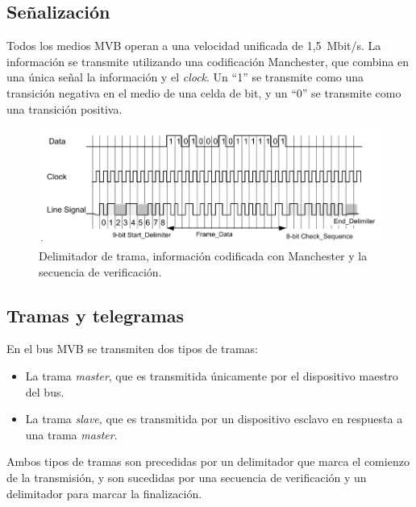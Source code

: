 \subsection{Señalización}

Todos los medios MVB operan a una velocidad unificada de 1,5~Mbit/s.
La información se transmite utilizando una codificación Manchester, que combina en una única señal la información y el \textit{clock}.
Un ``1'' se transmite como una transición negativa en el medio de una celda de bit, y un ``0'' se transmite como una transición positiva.

\begin{figure}[htbp]
	\centering
	\includegraphics[width=1\textwidth]{./Figures/manchester.png}
	\caption[Delimitador de trama, información codificada con Manchester y la secuencia de verificación]{Delimitador de trama, información codificada con Manchester y la secuencia de verificación.
        \\ }
\end{figure}

\subsection{Tramas y telegramas}

En el bus MVB se transmiten dos tipos de tramas:

\begin{itemize}
\item La trama \textit{master}, que es transmitida únicamente por el dispositivo maestro del bus.
\item La trama \textit{slave}, que es transmitida por un dispositivo esclavo en respuesta a una trama \textit{master}.
\end{itemize}

Ambos tipos de tramas son precedidas por un delimitador que marca el comienzo de la transmisión, y son sucedidas por una secuencia de verificación y un delimitador para marcar la finalización.

